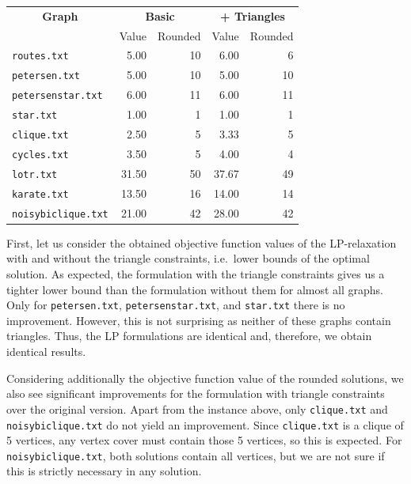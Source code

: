 \documentclass{article}
\begin{document}
\begin{center}
    \begin{tabular}{l|r r|r r}
        \multicolumn{1}{c}{\textbf{Graph}} & \multicolumn{2}{|c|}{\textbf{Basic}} & \multicolumn{2}{c}{\textbf{+ Triangles}}\\
        & Value & Rounded & Value & Rounded\\
        \hline
        \lstinline|routes.txt| & 5.00 & 10 & 6.00 & 6\\
        \lstinline|petersen.txt| & 5.00 & 10 & 5.00 & 10\\
        \lstinline|petersenstar.txt| & 6.00 & 11 & 6.00 & 11\\
        \lstinline|star.txt| & 1.00 & 1 & 1.00 & 1\\
        \lstinline|clique.txt| & 2.50 & 5 & 3.33 & 5\\
        \lstinline|cycles.txt| & 3.50 & 5 & 4.00 & 4\\
        \lstinline|lotr.txt| & 31.50 & 50 & 37.67 & 49\\
        \lstinline|karate.txt| & 13.50 & 16 & 14.00 & 14\\
        \lstinline|noisybiclique.txt| & 21.00 & 42 & 28.00 & 42\\
    \end{tabular}
\end{center}

First, let us consider the obtained objective function values of the LP-relaxation with and without the triangle constraints, i.e.~lower bounds of the optimal solution. As expected, the formulation with the triangle constraints gives us a tighter lower bound than the formulation without them for almost all graphs. Only for \lstinline|petersen.txt|, \lstinline|petersenstar.txt|, and \lstinline|star.txt| there is no improvement. However, this is not surprising as neither of these graphs contain triangles. Thus, the LP formulations are identical and, therefore, we obtain identical results.

Considering additionally the objective function value of the rounded solutions, we also see significant improvements for the formulation with triangle constraints over the original version. Apart from the instance above, only \lstinline|clique.txt| and \lstinline|noisybiclique.txt| do not yield an improvement. Since \lstinline|clique.txt| is a clique of 5 vertices, any vertex cover must contain those 5 vertices, so this is expected. For \lstinline|noisybiclique.txt|, both solutions contain all vertices, but we are not sure if this is strictly necessary in any solution.
\end{document}
